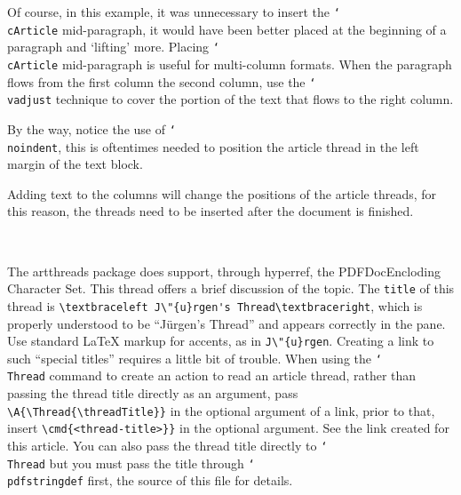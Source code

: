 \documentclass{article}
\providecommand{\cs}[1]{\texttt{\char`\\#1}}
\let\pkg\textsf
\begin{document}
\begin{multicols}{2}
Of course, in this example, it was unnecessary to insert the \cs{cArticle}
mid-paragraph, it would have been better placed at the beginning of a
paragraph and `lifting' more. Placing \cs{cArticle} mid-paragraph is useful
for multi-column formats. When the paragraph flows from the first column the
second column, use the \cs{vadjust} technique to cover the portion of the
text that flows to the right column.

By the way, notice the use of \cs{noindent}, this is
oftentimes needed to position the article thread in the left margin of the
text block.
\end{multicols}

\noindent
Adding text to the columns will change the positions of the article threads, for
this reason, the threads need to be inserted after the document is finished.



\pdfstringdef{}
\begin{center}
\\[10bp]
\begin{minipage}{5in}
\noindent{}%
The \pkg{artthreads} package does support, through \pkg{hyperref}, the PDFDocEncloding Character Set. This thread offers
a brief discussion of the topic. The \texttt{title} of this thread is
\verb~\textbraceleft J\"{u}rgen's Thread\textbraceright~, which is properly understood to be
``\textbraceleft J\"{u}rgen's Thread\textbraceright'' and appears correctly in the  pane.
Use standard {\LaTeX} markup for accents, as in \verb~J\"{u}rgen~. Creating a link to such ``special titles''
requires a little bit of trouble. When using the \cs{Thread} command to create an action to read an article thread,
rather than passing the thread title directly as an argument, pass \verb~\A{\Thread{\threadTitle}}~ in the optional
argument of a link, prior to that, insert \verb~\cmd{<thread-title>}}~ in the optional argument. See
the link created for this article. You can also pass the thread title directly to \cs{Thread} but you must
pass the title through \cs{pdfstringdef} first, the source of this file for details.
\end{minipage}
\end{center}
\end{document}
